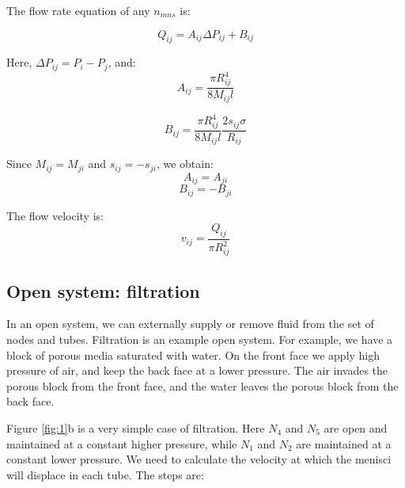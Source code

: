 \documentclass[
	12pt
] {article}
\begin{document}
	The flow rate equation of any $n_{mns}$ is:
	
	\begin{equation} \label{eq:flow-rate-simple}
		Q_{ij} = A_{ij}\Delta P_{ij} + B_{ij}
	\end{equation}
	
	Here, $\Delta P_{ij} = P_i - P_j$, and:
	\begin{equation} \label{eq:flow-rate-aij}
		A_{ij} = \frac{\pi R_{ij}^4}{8M_{ij}l}
	\end{equation}
	
	\begin{equation} \label{eq:flow-rate-bij}
		B_{ij} = \frac{\pi R_{ij}^4}{8M_{ij}l} \frac{2 s_{ij} \sigma}{R_{ij}}
	\end{equation}
	
	
	Since $M_{ij} = M_{ji}$ and $s_{ij} = -s_{ji}$, we obtain:
	\begin{equation} \label{eq:symm-a-ij}
		A_{ij} = A_{ji}
	\end{equation}
	\begin{equation} \label{eq:symm-b-ij}
		B_{ij} = -B_{ji} 
	\end{equation}
	
	The flow velocity is:
	\begin{equation} \label{eq:vel-from-flow-rate}
		v_{ij} = \frac{ Q_{ij} }{\pi R_{ij}^2}
	\end{equation}
	
\subsection{Open system: filtration}
	In an open system, we can externally supply or remove fluid from the set of nodes and tubes. Filtration is an example open system. For example, we have a block of porous media saturated with water. On the front face we apply high pressure of air, and keep the back face at a lower pressure. The air invades the porous block from the front face, and the water leaves the porous block from the back face. 
	
	Figure \ref{fig:1}b is a very simple case of filtration. Here $N_4$ and $N_5$ are open and maintained at a constant higher pressure, while $N_1$ and $N_2$ are maintained at a constant lower pressure. We need to calculate the velocity at which the menisci will displace in each tube. The steps are:
	
\end{document}
